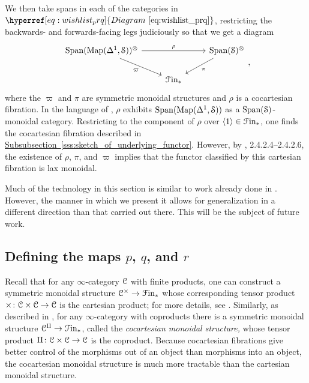 \documentclass[main.tex]{subfiles}
\begin{document}
We then take spans in each of the categories in $\hyperref[eq:wishlist_prq]{Diagram~\ref*{eq:wishlist_prq}}$, restricting the backwards- and forwards-facing legs judiciously so that we get a diagram
\begin{equation}
  \label{eq:wishlist_pivarpirho}
  \begin{tikzcd}
    \Span(\Map(\Delta^{1}, \S))^{\otimes}
    \arrow[rr, "\rho"]
    \arrow[dr, swap, "\varpi"]
    && \Span(\S)^{\otimes}
    \arrow[dl, "\pi"]
    \\
    & \Finp
  \end{tikzcd},
\end{equation}
where the $\varpi$ and $\pi$ are symmetric monoidal structures and $\rho$ is a cocartesian fibration. In the language of \cite{luriehigheralgebra}, $\rho$ exhibits $\mathrm{Span}(\mathrm{Map}(\Delta^{1}, \mathcal{S}))$ as a $\mathrm{Span}(\mathcal{S})$-monoidal category. Restricting to the component of $\rho$ over $\langle 1 \rangle \in \mathcal{F}\mathrm{in}_{*}$, one finds the cocartesian fibration described in \hyperref[sss:sketch_of_underlying_functor]{Subsubsection~\ref*{sss:sketch_of_underlying_functor}}. However, by \cite{luriehigheralgebra}, 2.4.2.4--2.4.2.6, the existence of $\rho$, $\pi$, and $\varpi$ implies that the functor classified by this cartesian fibration is lax monoidal.

Much of the technology in this section is similar to work already done in \cite{spectralmackeyfunctors2}. However, the manner in which we present it allows for generalization in a different direction than that carried out there. This will be the subject of future work.

\subsection{Defining the maps \texorpdfstring{$p$}{p}, \texorpdfstring{$q$}{q}, and \texorpdfstring{$r$}{r}}
\label{ssc:defining_the_maps_p_q_and_r}

Recall that for any $\infty$-category $\mathcal{C}$ with finite products, one can construct a symmetric monoidal structure $\mathcal{C}^{\times} \to \mathcal{F}\mathrm{in}_{*}$ whose corresponding tensor product $\times\colon \mathcal{C} \times \mathcal{C} \to \mathcal{C}$ is the cartesian product; for more details, see \cite[Sec.\ 2.4.1]{luriehigheralgebra}. Similarly, as described in \cite[Sec.\ 2.4.2]{luriehigheralgebra}, for any $\infty$-category with coproducts there is a symmetric monoidal structure $\mathcal{C}^{\amalg} \to \mathcal{F}\mathrm{in}_{*}$, called the \emph{cocartesian monoidal structure,} whose tensor product $\amalg\colon \mathcal{C} \times \mathcal{C} \to \mathcal{C}$ is the coproduct. Because cocartesian fibrations give better control of the morphisms out of an object than morphisms into an object, the cocartesian monoidal structure is much more tractable than the cartesian monoidal structure.
\end{document}
